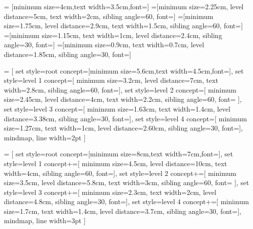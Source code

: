 =   [minimum size=4cm,text width=3.5cm,font=\pgfutil@font@large]
=[minimum size=2.25cm,
                             level distance=5cm,
                             text width=2cm,
                             sibling angle=60,
                             font=\pgfutil@font@small]
=[minimum size=1.75cm,%
                             level distance=2.9cm,%
                             text width=1.5cm,%
                             sibling angle=60,%
                             font=\pgfutil@font@footnotesize]
=[minimum size=1.15cm,%
                             text width=1cm,%
                             level distance=2.4cm,%
                             sibling angle=30,%
                             font=\pgfutil@font@tiny]
=[minimum size=0.9cm,%
                             text width=0.7cm,
                             level distance=1.85cm,%
                             sibling angle=30,%
                             font=\pgfutil@font@tiny]
  
=
  [%
  set style={{root concept}=[minimum size=5.6cm,text width=4.5cm,font=\pgfutil@font@Large]},
  set style={{level 1 concept}=[%
    minimum size=3.2cm,
    level distance=7cm,
    text width=2.8cm,
    sibling angle=60,
    font=]},%
  set style={{level 2 concept}=[%
    minimum size=2.45cm,%
    level distance=4cm,%
    text width=2.2cm,%
    sibling angle=60,%
    font=\pgfutil@font@small%
    ]},%
  set style={{level 3 concept}=[%
    minimum size=1.63cm,%
    text width=1.4cm,%
    level distance=3.38cm,%
    sibling angle=30,%
    font=\pgfutil@font@scriptsize]},%
  set style={{level 4 concept}=[%
    minimum size=1.27cm,%
    text width=1cm,
    level distance=2.60cm,%
    sibling angle=30,%
    font=\pgfutil@font@tiny]},%
  mindmap,%
  line width=2pt
  ]
  
=
  [%
  set style={{root concept}=[minimum size=8cm,text width=7cm,font=\pgfutil@font@huge]},
  set style={{level 1 concept}+=[%
    minimum size=4.5cm,
    level distance=10cm,
    text width=4cm,
    sibling angle=60,
    font=\pgfutil@font@large]},%
  set style={{level 2 concept}+=[%
    minimum size=3.5cm,%
    level distance=5.8cm,%
    text width=3cm,%
    sibling angle=60,%
    font=%
    ]},%
  set style={{level 3 concept}+=[%
    minimum size=2.3cm,%
    text width=2cm,%
    level distance=4.8cm,%
    sibling angle=30,%
    font=\pgfutil@font@footnotesize]},%
  set style={{level 4 concept}+=[%
    minimum size=1.7cm,%
    text width=1.4cm,
    level distance=3.7cm,%
    sibling angle=30,%
    font=\pgfutil@font@scriptsize]},%
  mindmap,%
  line width=3pt
  ]
  

